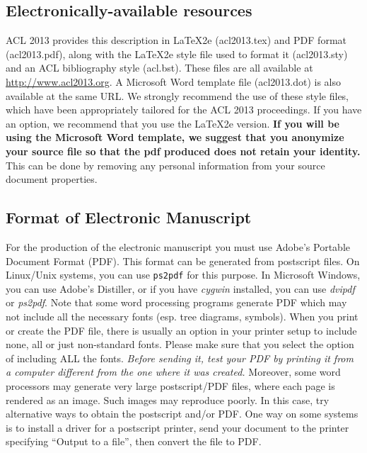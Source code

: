 \documentclass[11pt]{article}
\begin{document}
\subsection{Electronically-available resources}

ACL 2013 provides this description in \LaTeX2e (acl2013.tex) and PDF
format (acl2013.pdf), along with the \LaTeX2e style file used to
format it (acl2013.sty) and an ACL bibliography style
(acl.bst). These files are all available at
\url{http://www.acl2013.org}. A Microsoft Word
template file (acl2013.dot) is also available at the same URL. We
strongly recommend the use of these style files, which have been
appropriately tailored for the ACL 2013 proceedings. If you have an
option, we recommend that you use the \LaTeX2e version. \textbf{If you will be
using the Microsoft Word template, we suggest that you anonymize your
source file so that the pdf produced does not retain your identity.}
This can be done by removing any personal information from your source
document properties.



\subsection{Format of Electronic Manuscript}
\label{sect:pdf}

For the production of the electronic manuscript you must use Adobe's
Portable Document Format (PDF). This format can be generated from
postscript files. On Linux/Unix systems, you can use {\tt ps2pdf} for
this purpose. In Microsoft Windows, you can use Adobe's Distiller,
or if you have \textit{cygwin}
installed, you can use \textit{dvipdf} or \textit{ps2pdf}. Note that
some word processing programs generate PDF which may not include all
the necessary fonts (esp. tree diagrams, symbols). When you print or
create the PDF file, there is usually an option in your printer setup
to include none, all or just non-standard fonts.  Please make sure
that you select the option of including ALL the fonts. {\em Before
sending it, test your PDF by printing it from a computer different
from the one where it was created.} Moreover, some word processors may
generate very large postscript/PDF files, where each page is rendered
as an image. Such images may reproduce poorly. In this case, try
alternative ways to obtain the postscript and/or PDF. One way on some
systems is to install a driver for a postscript printer, send your
document to the printer specifying ``Output to a file'', then convert
the file to PDF.
\end{document}

